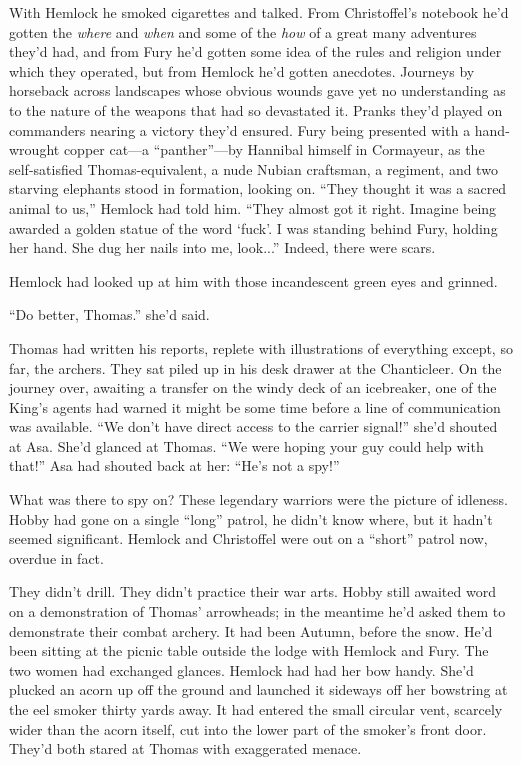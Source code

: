 \documentclass[11pt,a5paper]{article}
\begin{document}
With Hemlock he smoked cigarettes and talked. From Christoffel's notebook he'd gotten the \emph{where} and \emph{when} and some of the \emph{how} of a great many adventures they'd had, and from Fury he'd gotten some idea of the rules and religion under which they operated, but from Hemlock he'd gotten anecdotes. Journeys by horseback across landscapes whose obvious wounds gave yet no understanding as to the nature of the weapons that had so devastated it. Pranks they'd played on commanders nearing a victory they'd ensured. Fury being presented with a hand-wrought copper cat---a ``panther''---by Hannibal himself in Cormayeur, as the self-satisfied Thomas-equivalent, a nude Nubian craftsman, a regiment, and two starving elephants stood in formation, looking on. ``They thought it was a sacred animal to us,'' Hemlock had told him. ``They almost got it right. Imagine being awarded a golden statue of the word `fuck'. I was standing behind Fury, holding her hand. She dug her nails into me, look...'' Indeed, there were scars.

Hemlock had looked up at him with those incandescent green eyes and grinned.

``Do better, Thomas.'' she'd said.

Thomas had written his reports, replete with illustrations of everything except, so far, the archers. They sat piled up in his desk drawer at the Chanticleer. On the journey over, awaiting a transfer on the windy deck of an icebreaker, one of the King's agents had warned it might be some time before a line of communication was available. ``We don't have direct access to the carrier signal!'' she'd shouted at Asa. She'd glanced at Thomas. ``We were hoping your guy could help with that!'' Asa had shouted back at her: ``He's not a spy!''

What was there to spy on? These legendary warriors were the picture of idleness. Hobby had gone on a single ``long'' patrol, he didn't know where, but it hadn't seemed significant. Hemlock and Christoffel were out on a ``short'' patrol now, overdue in fact.

They didn't drill. They didn't practice their war arts. Hobby still awaited word on a demonstration of Thomas' arrowheads; in the meantime he'd asked them to demonstrate their combat archery. It had been Autumn, before the snow. He'd been sitting at the picnic table outside the lodge with Hemlock and Fury. The two women had exchanged glances. Hemlock had had her bow handy. She'd plucked an acorn up off the ground and launched it sideways off her bowstring at the eel smoker thirty yards away. It had entered the small circular vent, scarcely wider than the acorn itself, cut into the lower part of the smoker's front door. They'd both stared at Thomas with exaggerated menace.
\end{document}
